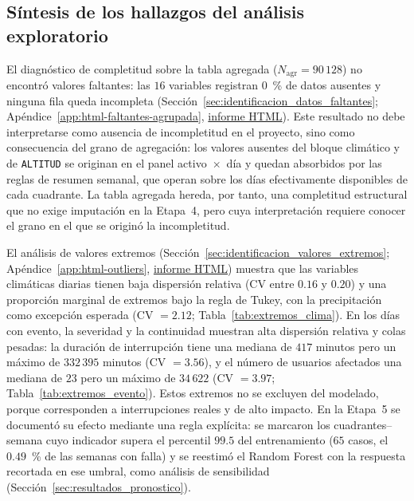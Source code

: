 \subsection{Síntesis de los hallazgos del análisis exploratorio}
\label{sec:sintesis_eda}


El diagnóstico de completitud sobre la tabla agregada ($N_{\mathrm{agr}} = 90\,128$) no encontró valores faltantes: las $16$ variables registran $0$~\% de datos ausentes y ninguna fila queda incompleta (Sección~\ref{sec:identificacion_datos_faltantes}; Apéndice~\ref{app:html-faltantes-agrupada}, \href{\urlfaltantesagrupada}{informe HTML}). Este resultado no debe interpretarse como ausencia de incompletitud en el proyecto, sino como consecuencia del grano de agregación: los valores ausentes del bloque climático y de \texttt{ALTITUD} se originan en el panel activo~$\times$~día y quedan absorbidos por las reglas de resumen semanal, que operan sobre los días efectivamente disponibles de cada cuadrante. La tabla agregada hereda, por tanto, una completitud estructural que no exige imputación en la Etapa~4, pero cuya interpretación requiere conocer el grano en el que se originó la incompletitud.

El análisis de valores extremos (Sección~\ref{sec:identificacion_valores_extremos}; Apéndice~\ref{app:html-outliers}, \href{\urldetectionoutliers}{informe HTML}) muestra que las variables climáticas diarias tienen baja dispersión relativa (CV entre $0{.}16$ y $0{.}20$) y una proporción marginal de extremos bajo la regla de Tukey, con la precipitación como excepción esperada (CV $=2{.}12$; Tabla~\ref{tab:extremos_clima}). En los días con evento, la severidad y la continuidad muestran alta dispersión relativa y colas pesadas: la duración de interrupción tiene una mediana de $417$ minutos pero un máximo de $332\,395$ minutos (CV $=3{.}56$), y el número de usuarios afectados una mediana de $23$ pero un máximo de $34\,622$ (CV $=3{.}97$; Tabla~\ref{tab:extremos_evento}). Estos extremos no se excluyen del modelado, porque corresponden a interrupciones reales y de alto impacto. En la Etapa~5 se documentó su efecto mediante una regla explícita: se marcaron los cuadrantes--semana cuyo indicador supera el percentil $99{.}5$ del entrenamiento ($65$ casos, el $0{.}49$~\% de las semanas con falla) y se reestimó el Random Forest con la respuesta recortada en ese umbral, como análisis de sensibilidad (Sección~\ref{sec:resultados_pronostico}).

